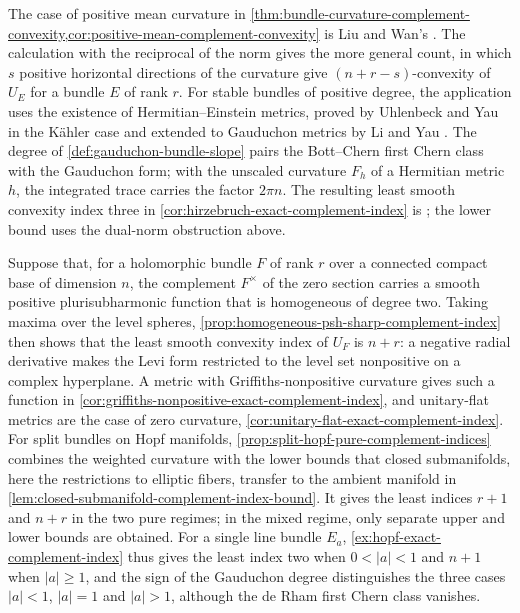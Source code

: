 The case of positive mean curvature in \cref{thm:bundle-curvature-complement-convexity,cor:positive-mean-complement-convexity} is Liu and Wan's \cite[v1, Proposition~5.4, pp.~32--33]{LiuWanKobayashi26}. The calculation with the reciprocal of the norm gives the more general count, in which $s$ positive horizontal directions of the curvature give $(n+r-s)$-convexity of $U_E$ for a bundle $E$ of rank $r$. For stable bundles of positive degree, the application uses the existence of Hermitian--Einstein metrics, proved by Uhlenbeck and Yau \cite{UhlenbeckYau86} in the K\"ahler case and extended to Gauduchon metrics by Li and Yau \cite{LiYau87}. The degree of \cref{def:gauduchon-bundle-slope} pairs the Bott--Chern first Chern class with the Gauduchon form; with the unscaled curvature $F_h$ of a Hermitian metric $h$, the integrated trace carries the factor $2\pi n$. The resulting least smooth convexity index three in \cref{cor:hirzebruch-exact-complement-index} is \cite[v1, Corollary~5.5, p.~33]{LiuWanKobayashi26}; the lower bound uses the dual-norm obstruction above.

Suppose that, for a holomorphic bundle $F$ of rank $r$ over a connected compact base of dimension $n$, the complement $F^\times$ of the zero section carries a smooth positive plurisubharmonic function that is homogeneous of degree two. Taking maxima over the level spheres, \cref{prop:homogeneous-psh-sharp-complement-index} then shows that the least smooth convexity index of $U_F$ is $n+r$: a negative radial derivative makes the Levi form restricted to the level set nonpositive on a complex hyperplane. A metric with Griffiths-nonpositive curvature gives such a function in \cref{cor:griffiths-nonpositive-exact-complement-index}, and unitary-flat metrics are the case of zero curvature, \cref{cor:unitary-flat-exact-complement-index}. For split bundles on Hopf manifolds, \cref{prop:split-hopf-pure-complement-indices} combines the weighted curvature with the lower bounds that closed submanifolds, here the restrictions to elliptic fibers, transfer to the ambient manifold in \cref{lem:closed-submanifold-complement-index-bound}. It gives the least indices $r+1$ and $n+r$ in the two pure regimes; in the mixed regime, only separate upper and lower bounds are obtained. For a single line bundle $E_a$, \cref{ex:hopf-exact-complement-index} thus gives the least index two when $0<|a|<1$ and $n+1$ when $|a|\geq1$, and the sign of the Gauduchon degree distinguishes the three cases $|a|<1$, $|a|=1$ and $|a|>1$, although the de Rham first Chern class vanishes.

